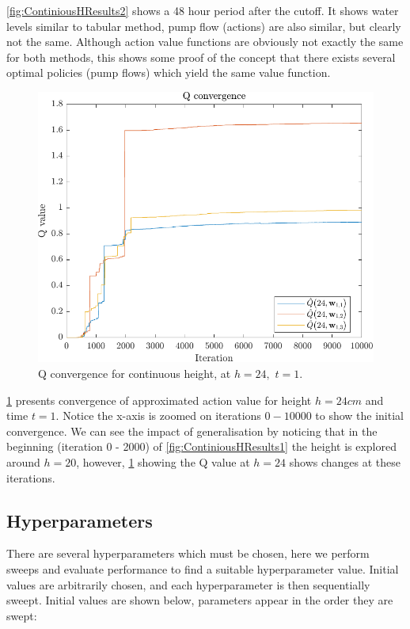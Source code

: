 \cref{fig:ContiniousHResults2} shows a 48 hour period after the cutoff. It shows water levels similar to tabular method, pump flow (actions) are also similar, but clearly not the same. Although action value functions are obviously not exactly the same for both methods, this shows some proof of the concept that there exists several optimal policies (pump flows) which yield the same value function. 

\clearpage \newpage
\begin{figure}[h!]
	\centering
	\includegraphics[width=0.7\linewidth]{figures/ContiniousHResults3.pdf}
	\caption{Q convergence for continuous height, at $h = 24,$ $t = 1$.}
	\label{fig:ContiniousHeightQConvergence}
\end{figure}
 
\cref{fig:ContiniousHeightQConvergence} presents convergence of approximated action value for height $ h=24\si{cm} $ and time $ t=1 $. Notice the x-axis is zoomed on iterations $0 - 10000$ to show the initial convergence. We can see the impact of generalisation by noticing that in the beginning (iteration 0 - 2000) of \cref{fig:ContiniousHResults1} the height is explored around $h=20$, however, \cref{fig:ContiniousHeightQConvergence} showing the Q value at $h=24$ shows changes at these iterations.



\newpage

\iffalse
\subsection{Hyperparameters}
There are several hyperparameters which must be chosen, here we perform sweeps and evaluate performance to find a suitable hyperparameter value. Initial values are arbitrarily chosen, and each hyperparameter is then sequentially sweept. Initial values are shown below, parameters appear in the order they are swept:

